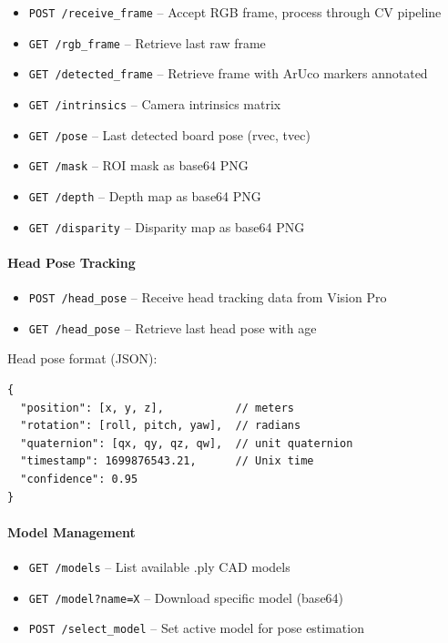 \begin{itemize}
    \item \texttt{POST /receive\_frame} -- Accept RGB frame, process through CV pipeline
    \item \texttt{GET /rgb\_frame} -- Retrieve last raw frame
    \item \texttt{GET /detected\_frame} -- Retrieve frame with ArUco markers annotated
    \item \texttt{GET /intrinsics} -- Camera intrinsics matrix
    \item \texttt{GET /pose} -- Last detected board pose (rvec, tvec)
    \item \texttt{GET /mask} -- ROI mask as base64 PNG
    \item \texttt{GET /depth} -- Depth map as base64 PNG
    \item \texttt{GET /disparity} -- Disparity map as base64 PNG
\end{itemize}

\paragraph{Head Pose Tracking}

\begin{itemize}
    \item \texttt{POST /head\_pose} -- Receive head tracking data from Vision Pro
    \item \texttt{GET /head\_pose} -- Retrieve last head pose with age
\end{itemize}

Head pose format (JSON):
\begin{verbatim}
{
  "position": [x, y, z],           // meters
  "rotation": [roll, pitch, yaw],  // radians
  "quaternion": [qx, qy, qz, qw],  // unit quaternion
  "timestamp": 1699876543.21,      // Unix time
  "confidence": 0.95
}
\end{verbatim}

\paragraph{Model Management}

\begin{itemize}
    \item \texttt{GET /models} -- List available .ply CAD models
    \item \texttt{GET /model?name=X} -- Download specific model (base64)
    \item \texttt{POST /select\_model} -- Set active model for pose estimation
\end{itemize}

